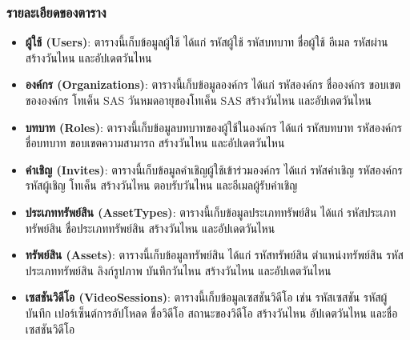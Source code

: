 \subsubsection{รายละเอียดของตาราง}
\begin{itemize}
    \item \textbf{ผู้ใช้ (Users)}: ตารางนี้เก็บข้อมูลผู้ใช้ ได้แก่ รหัสผู้ใช้ รหัสบทบาท ชื่อผู้ใช้ อีเมล รหัสผ่าน สร้างวันไหน และอัปเดตวันไหน
    \item \textbf{องค์กร (Organizations)}: ตารางนี้เก็บข้อมูลองค์กร ได้แก่ รหัสองค์กร ชื่อองค์กร ขอบเขตขององค์กร โทเค็น SAS วันหมดอายุของโทเค็น SAS สร้างวันไหน และอัปเดตวันไหน
    \item \textbf{บทบาท (Roles)}: ตารางนี้เก็บข้อมูลบทบาทของผู้ใช้ในองค์กร ได้แก่ รหัสบทบาท รหัสองค์กร ชื่อบทบาท ขอบเขตความสามารถ สร้างวันไหน และอัปเดตวันไหน
    \item \textbf{คำเชิญ (Invites)}: ตารางนี้เก็บข้อมูลคำเชิญผู้ใช้เข้าร่วมองค์กร ได้แก่ รหัสคำเชิญ รหัสองค์กร รหัสผู้เชิญ โทเค็น สร้างวันไหน ตอบรับวันไหน และอีเมลผู้รับคำเชิญ
    \item \textbf{ประเภททรัพย์สิน (AssetTypes)}: ตารางนี้เก็บข้อมูลประเภททรัพย์สิน ได้แก่ รหัสประเภททรัพย์สิน ชื่อประเภททรัพย์สิน สร้างวันไหน และอัปเดตวันไหน
    \item \textbf{ทรัพย์สิน (Assets)}: ตารางนี้เก็บข้อมูลทรัพย์สิน ได้แก่ รหัสทรัพย์สิน ตำแหน่งทรัพย์สิน รหัสประเภททรัพย์สิน ลิงก์รูปภาพ บันทึกวันไหน สร้างวันไหน และอัปเดตวันไหน
    \item \textbf{เซสชันวิดีโอ (VideoSessions)}: ตารางนี้เก็บข้อมูลเซสชันวิดีโอ เช่น รหัสเซสชัน รหัสผู้บันทึก เปอร์เซ็นต์การอัปโหลด ชื่อวิดีโอ สถานะของวิดีโอ สร้างวันไหน อัปเดตวันไหน และชื่อเซสชันวิดีโอ
\end{itemize}

